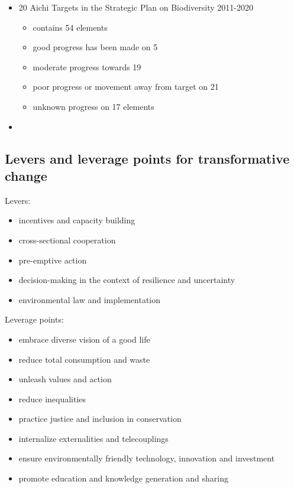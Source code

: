 \begin{itemize}
	\item 20 Aichi Targets in the Strategic Plan on Biodiversity
		2011-2020
		\begin{itemize}
			\item contains 54 elements
			\item good progress has been made on 5
			\item moderate progress towards 19
			\item poor progress or movement away from target on 21
			\item unknown progress on 17 elements
		\end{itemize}
	\item 
\end{itemize}

\subsection{Levers and leverage points for transformative change}

Levers:

\begin{itemize}
	\item incentives and capacity building
	\item cross-sectional cooperation
	\item pre-emptive action
	\item decision-making in the context of resilience and uncertainty
	\item environmental law and implementation
\end{itemize}

Leverage points:
\begin{itemize}
	\item embrace diverse vision of a good life
	\item reduce total consumption and waste
	\item unleash values and action
	\item reduce inequalities
	\item practice justice and inclusion in conservation
	\item internalize externalities and telecouplings
	\item ensure environmentally friendly technology, innovation and
		investment
	\item promote education and knowledge generation and sharing
\end{itemize}

